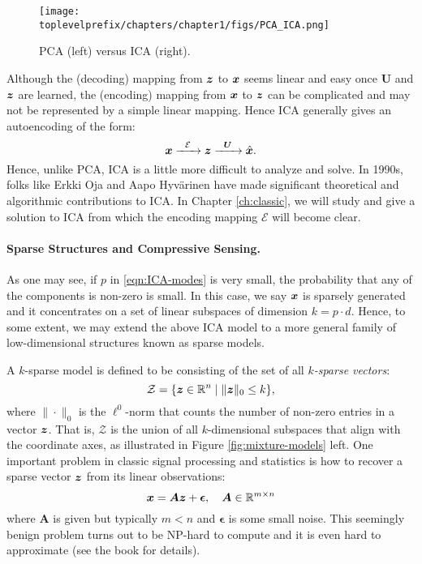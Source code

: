 \documentclass[\toplevelprefix/book-main.tex]{subfiles}
\begin{document}
\begin{figure}
    \centering
    \texttt{[image: \\toplevelprefix/chapters/chapter1/figs/PCA\_ICA.png]}
    \caption{PCA (left) versus ICA (right).}
    \label{fig:ICA-PCA}
\end{figure}

Although the (decoding) mapping from $\bm{z}$ to $\bm{x}$ seems linear and easy once $\boldsymbol{U}$ and $\bm{z}$ are learned, the (encoding) mapping from $\bm{x}$ to $\bm{z}$ can be complicated and may not be represented by a simple linear mapping. Hence ICA generally gives an autoencoding of the form:
\begin{equation}
    \bm{x}   \xrightarrow{\hspace{2mm} \mathcal{E}\hspace{2mm}} \bm{z}  \xrightarrow{\hspace{2mm} \boldsymbol{U} \hspace{2mm}} \hat {\bm{x}}.
       \label{eqn:auto-encoding-ICA}
\end{equation}
Hence, unlike PCA, ICA is a little more difficult to analyze and solve. In 1990s, folks like Erkki Oja and Aapo Hyv\"{a}rinen \cite{hyvarinen-1997,Hyvrinen-2000} have made significant theoretical and algorithmic contributions to ICA. In Chapter \ref{ch:classic}, we will study and give a solution to ICA from which the encoding mapping $\mathcal{E}$ will become clear.



\paragraph{Sparse Structures and Compressive Sensing.}
As one may see, if $p$ in \eqref{eqn:ICA-modes} is very small, the probability that any of the components is non-zero is small. In this case, we say $\bm{x}$ is sparsely generated and it concentrates on a set of linear subspaces of dimension $k = p \cdot d$. Hence, to some extent, we may extend the above ICA model to a more general family of low-dimensional structures known as sparse models. 

A $k$-sparse model is defined to be consisting of the set of all {\em $k$-sparse vectors}:
\begin{equation}
    \mathcal{Z} = \{\bm{z} \in \mathbb{R}^n \mid \|\bm{z}\|_0 \le k\},
\end{equation}
where $\| \cdot \|_0$ is the $\ell^0$-norm that counts the number of non-zero entries in a vector $\bm{z}$. That is, $\mathcal{Z}$ is the union of all $k$-dimensional subspaces that align with the coordinate axes, as illustrated in Figure \ref{fig:mixture-models} left. One important problem in classic signal processing and statistics is how to recover a sparse vector $\bm{z}$ from its linear observations:
\begin{equation}
    \bm{x} = \boldsymbol{A} \bm{z} + \boldsymbol{\epsilon}, \quad \boldsymbol{A} \in \mathbb{R}^{m\times n}
    \label{eqn:sparse-model}
\end{equation}
where $\boldsymbol{A}$ is given but typically $m < n$ and $\boldsymbol{\epsilon}$ is some small noise. This seemingly benign problem turns out to be NP-hard to compute and it is even hard to approximate (see the book \cite{Wright-Ma-2022} for details). 
\end{document}
